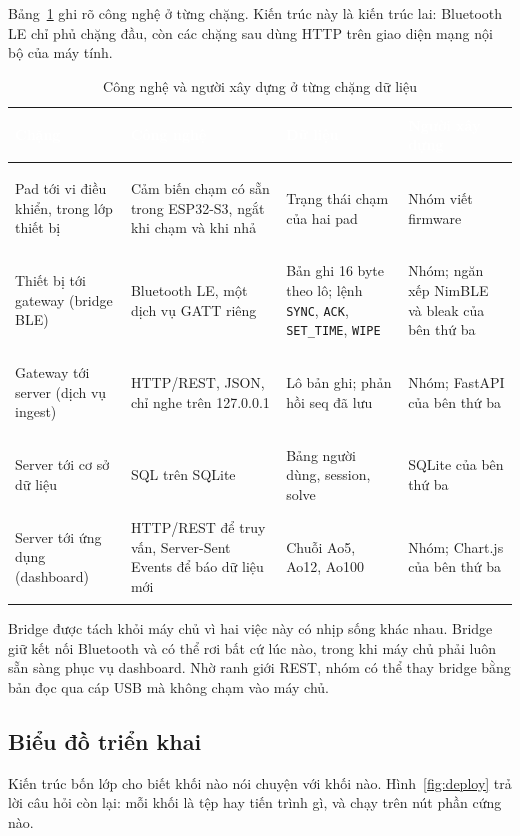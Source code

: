 Bảng~\ref{tab:hops} ghi rõ công nghệ ở từng chặng. Kiến trúc này là kiến trúc lai: Bluetooth LE chỉ phủ chặng đầu, còn các chặng sau dùng HTTP trên giao diện mạng nội bộ của máy tính.

\begin{table}[H]
    \centering
    \small
    \renewcommand{\arraystretch}{1.4}
    \caption{Công nghệ và người xây dựng ở từng chặng dữ liệu}
    \label{tab:hops}
    \begin{tabular}{>{\bfseries\raggedright\arraybackslash}m{3.1cm} >{\raggedright\arraybackslash}m{4.4cm} >{\raggedright\arraybackslash}m{3.6cm} >{\raggedright\arraybackslash}m{3.0cm}}
        \toprule
        \rowcolor{haitayblue}
        \textcolor{white}{Chặng} & \textcolor{white}{Công nghệ} & \textcolor{white}{Dữ liệu} & \textcolor{white}{Người xây dựng} \\
        \midrule
        \rowcolor{haitayblue!8}
        Pad tới vi điều khiển, trong lớp thiết bị & Cảm biến chạm có sẵn trong ESP32-S3, ngắt khi chạm và khi nhả & Trạng thái chạm của hai pad & Nhóm viết firmware \\
        Thiết bị tới gateway (bridge BLE) & Bluetooth LE, một dịch vụ GATT riêng & Bản ghi 16 byte theo lô; lệnh \texttt{SYNC}, \texttt{ACK}, \texttt{SET\_TIME}, \texttt{WIPE} & Nhóm; ngăn xếp NimBLE và bleak của bên thứ ba \\
        \rowcolor{haitayblue!8}
        Gateway tới server (dịch vụ ingest) & HTTP/REST, JSON, chỉ nghe trên 127.0.0.1 & Lô bản ghi; phản hồi seq đã lưu & Nhóm; FastAPI của bên thứ ba \\
        Server tới cơ sở dữ liệu & SQL trên SQLite & Bảng người dùng, session, solve & SQLite của bên thứ ba \\
        \rowcolor{haitayblue!8}
        Server tới ứng dụng (dashboard) & HTTP/REST để truy vấn, Server-Sent Events để báo dữ liệu mới & Chuỗi Ao5, Ao12, Ao100 & Nhóm; Chart.js của bên thứ ba \\
        \bottomrule
    \end{tabular}
\end{table}

Bridge được tách khỏi máy chủ vì hai việc này có nhịp sống khác nhau. Bridge giữ kết nối Bluetooth và có thể rơi bất cứ lúc nào, trong khi máy chủ phải luôn sẵn sàng phục vụ dashboard. Nhờ ranh giới REST, nhóm có thể thay bridge bằng bản đọc qua cáp USB mà không chạm vào máy chủ.

\subsection{Biểu đồ triển khai}
Kiến trúc bốn lớp cho biết khối nào nói chuyện với khối nào. Hình~\ref{fig:deploy} trả lời câu hỏi còn lại: mỗi khối là tệp hay tiến trình gì, và chạy trên nút phần cứng nào.

